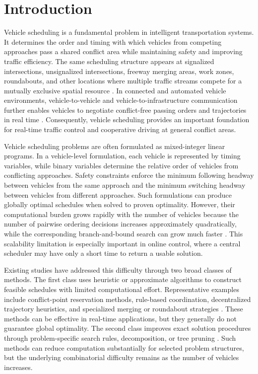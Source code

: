 \section{Introduction}
\label{sec:introduction}

Vehicle scheduling is a fundamental problem in intelligent transportation systems. It determines the order and timing with which vehicles from competing approaches pass a shared conflict area while maintaining safety and improving traffic efficiency. The same scheduling structure appears at signalized intersections, unsignalized intersections, freeway merging areas, work zones, roundabouts, and other locations where multiple traffic streams compete for a mutually exclusive spatial resource \citep{yu2017optimization,soleimaniamiri2020joint,rios2017automated,martingasulla2021traffic}. In connected and automated vehicle environments, vehicle-to-vehicle and vehicle-to-infrastructure communication further enables vehicles to negotiate conflict-free passing orders and trajectories in real time \citep{chen2016cooperative,li2006cooperative,liu2019trajectory}. Consequently, vehicle scheduling provides an important foundation for real-time traffic control and cooperative driving at general conflict areas.

Vehicle scheduling problems are often formulated as mixed-integer linear programs. In a vehicle-level formulation, each vehicle is represented by timing variables, while binary variables determine the relative order of vehicles from conflicting approaches. Safety constraints enforce the minimum following headway between vehicles from the same approach and the minimum switching headway between vehicles from different approaches. Such formulations can produce globally optimal schedules when solved to proven optimality. However, their computational burden grows rapidly with the number of vehicles because the number of pairwise ordering decisions increases approximately quadratically, while the corresponding branch-and-bound search can grow much faster \citep{chen2016cooperative,wolsey1999integer}. This scalability limitation is especially important in online control, where a central scheduler may have only a short time to return a usable solution.

Existing studies have addressed this difficulty through two broad classes of methods. The first class uses heuristic or approximate algorithms to construct feasible schedules with limited computational effort. Representative examples include conflict-point reservation methods, rule-based coordination, decentralized trajectory heuristics, and specialized merging or roundabout strategies \citep{debada2016autonomous,liu2019trajectory,rios2017automated,martingasulla2021traffic}. These methods can be effective in real-time applications, but they generally do not guarantee global optimality. The second class improves exact solution procedures through problem-specific search rules, decomposition, or tree pruning \citep{li2006cooperative,xu2019tree}. Such methods can reduce computation substantially for selected problem structures, but the underlying combinatorial difficulty remains as the number of vehicles increases.

